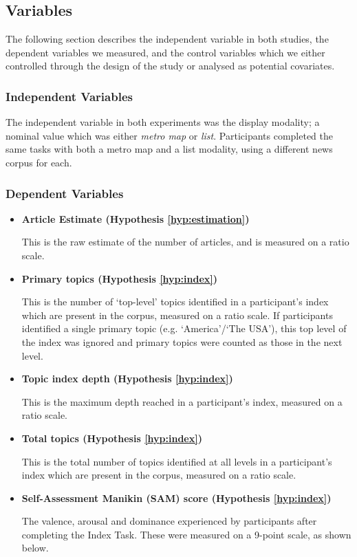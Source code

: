 \subsection{Variables}

The following section describes the independent variable in both studies, the dependent variables we measured, and the control variables which we either controlled through the design of the study or analysed as potential covariates.

\subsubsection{Independent Variables}

The independent variable in both experiments was the display modality; a nominal value which was either \textit{metro map} or \textit{list}. Participants completed the same tasks with both a metro map and a list modality, using a different news corpus for each.

\subsubsection{Dependent Variables}

\begin{itemize}
	\item\textbf{Article Estimate (Hypothesis \ref{hyp:estimation})} \par
		This is the raw estimate of the number of articles, and is measured on a ratio scale. 
	\item\textbf{Primary topics (Hypothesis \ref{hyp:index})} \par
		This is the number of `top-level' topics identified in a participant's index which are present in the corpus, measured on a ratio scale. If participants identified a single primary topic (e.g. `America'/`The USA'), this top level of the index was ignored and primary topics were counted as those in the next level.
	\item\textbf{Topic index depth (Hypothesis \ref{hyp:index})} \par
		This is the maximum depth reached in a participant's index, measured on a ratio scale.
	\item\textbf{Total topics (Hypothesis \ref{hyp:index})} \par
		This is the total number of topics identified at all levels in a participant's index which are present in the corpus, measured on a ratio scale.
	\item\textbf{Self-Assessment Manikin (SAM) score (Hypothesis \ref{hyp:index})} \par
		The valence, arousal and dominance experienced by participants after completing the Index Task. These were measured on a 9-point scale, as shown below.

\end{itemize}

